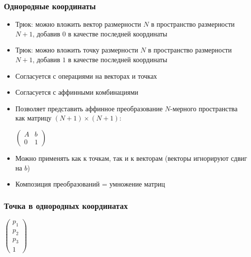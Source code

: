\documentclass{beamer}
\begin{document}
\begin{frame}[fragile]
\frametitle{Однородные координаты}
\begin{itemize}
\item Трюк: можно вложить вектор размерности \begin{math}N\end{math} в пространство размерности \begin{math}N+1\end{math}, добавив \begin{math}0\end{math} в качестве последней координаты
\pause
\item Трюк: можно вложить точку размерности \begin{math}N\end{math} в пространство размерности \begin{math}N+1\end{math}, добавив \begin{math}1\end{math} в качестве последней координаты
\pause
\item Согласуется с операциями на векторах и точках
\pause
\item Согласуется с аффинными комбинациями
\pause
\item Позволяет представить аффинное преобразование \begin{math}N\end{math}-мерного пространства как матрицу \begin{math}(N+1)\times (N+1)\end{math}:

\begin{math}
\begin{pmatrix}
A & b \\
0 & 1
\end{pmatrix}
\end{math}
\pause
\item Можно применять как к точкам, так и к векторам (векторы игнорируют сдвиг на \begin{math}b\end{math})
\pause
\item Композиция преобразований = умножение матриц
\end{itemize}
\end{frame}

\begin{frame}[fragile]
\frametitle{Точка в однородных координатах}
\begin{center}
\begin{math}
\begin{pmatrix}
p_1 \\
p_2 \\
p_3 \\
1
\end{pmatrix}
\end{math}
\end{center}
\end{frame}
\end{document}
